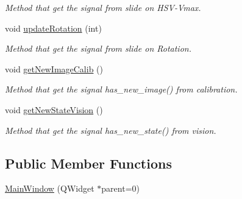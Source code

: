 \begin{DoxyCompactItemize}
\begin{DoxyCompactList}\small\item\em Method that get the signal from slide on H\+S\+V-\/\+Vmax. \end{DoxyCompactList}\item 
void \hyperlink{classMainWindow_a6c6ff08babc2f86d2484aa7a97b671e0}{update\+Rotation} (int)\hypertarget{classMainWindow_a6c6ff08babc2f86d2484aa7a97b671e0}{}\label{classMainWindow_a6c6ff08babc2f86d2484aa7a97b671e0}

\begin{DoxyCompactList}\small\item\em Method that get the signal from slide on Rotation. \end{DoxyCompactList}\item 
void \hyperlink{classMainWindow_a05ab58ddf53a08fd87eaa649a613a7de}{get\+New\+Image\+Calib} ()\hypertarget{classMainWindow_a05ab58ddf53a08fd87eaa649a613a7de}{}\label{classMainWindow_a05ab58ddf53a08fd87eaa649a613a7de}

\begin{DoxyCompactList}\small\item\em Method that get the signal has\+\_\+new\+\_\+image() from calibration. \end{DoxyCompactList}\item 
void \hyperlink{classMainWindow_aa319f5224d5e0532849393c96e85f006}{get\+New\+State\+Vision} ()\hypertarget{classMainWindow_aa319f5224d5e0532849393c96e85f006}{}\label{classMainWindow_aa319f5224d5e0532849393c96e85f006}

\begin{DoxyCompactList}\small\item\em Method that get the signal has\+\_\+new\+\_\+state() from vision. \end{DoxyCompactList}\end{DoxyCompactItemize}
\subsection*{Public Member Functions}
\begin{DoxyCompactItemize}
\item 
\hyperlink{classMainWindow_a8b244be8b7b7db1b08de2a2acb9409db}{Main\+Window} (Q\+Widget $\ast$parent=0)
\end{DoxyCompactItemize}

